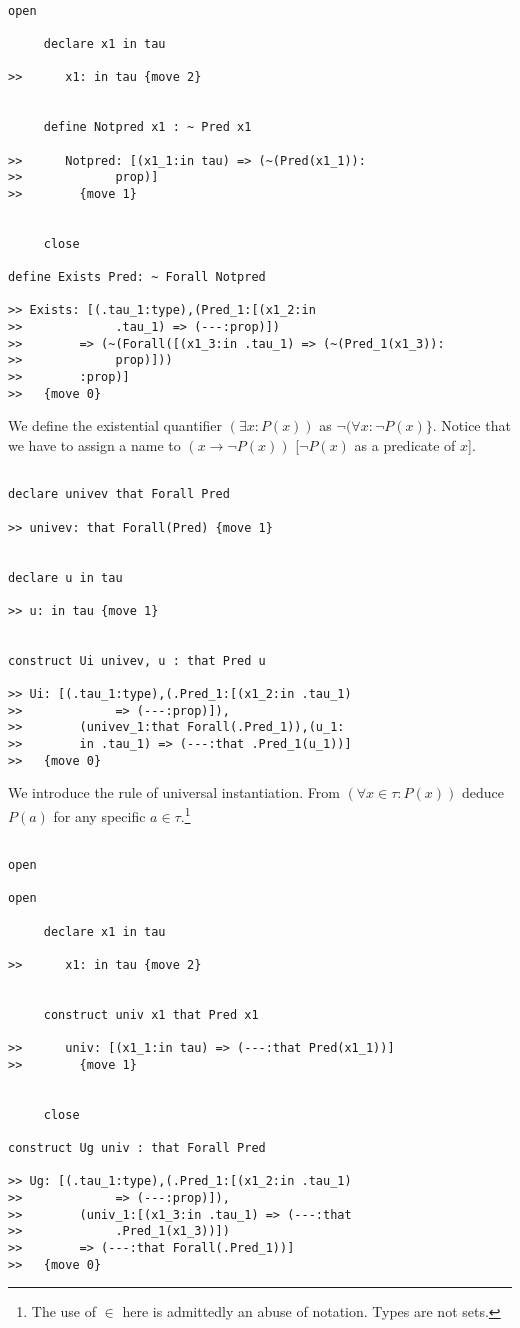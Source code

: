 \documentclass[12pt]{article}
\begin{document}
\begin{verbatim}

open

     declare x1 in tau

>>      x1: in tau {move 2}


     define Notpred x1 : ~ Pred x1

>>      Notpred: [(x1_1:in tau) => (~(Pred(x1_1)):
>>             prop)]
>>        {move 1}


     close

define Exists Pred: ~ Forall Notpred

>> Exists: [(.tau_1:type),(Pred_1:[(x1_2:in 
>>             .tau_1) => (---:prop)])
>>        => (~(Forall([(x1_3:in .tau_1) => (~(Pred_1(x1_3)):
>>             prop)]))
>>        :prop)]
>>   {move 0}

\end{verbatim}

We define the existential quantifier $(\exists x:P(x))$ as $\neg(\forall x:\neg P(x)\}$.  Notice that we have to
assign a name to $(x \rightarrow \neg P(x))$ [$\neg P(x)$ as a predicate of $x$].

\begin{verbatim}

declare univev that Forall Pred

>> univev: that Forall(Pred) {move 1}


declare u in tau

>> u: in tau {move 1}


construct Ui univev, u : that Pred u

>> Ui: [(.tau_1:type),(.Pred_1:[(x1_2:in .tau_1) 
>>             => (---:prop)]),
>>        (univev_1:that Forall(.Pred_1)),(u_1:
>>        in .tau_1) => (---:that .Pred_1(u_1))]
>>   {move 0}

\end{verbatim}

We introduce the rule of universal instantiation.  From $(\forall x \in \tau:P(x))$ deduce $P(a)$ for any specific $a \in \tau$.\footnote{The use of $\in$ here is admittedly an abuse of notation.  Types are not sets.}

\begin{verbatim}

open

open

     declare x1 in tau

>>      x1: in tau {move 2}


     construct univ x1 that Pred x1

>>      univ: [(x1_1:in tau) => (---:that Pred(x1_1))]
>>        {move 1}


     close

construct Ug univ : that Forall Pred

>> Ug: [(.tau_1:type),(.Pred_1:[(x1_2:in .tau_1) 
>>             => (---:prop)]),
>>        (univ_1:[(x1_3:in .tau_1) => (---:that 
>>             .Pred_1(x1_3))])
>>        => (---:that Forall(.Pred_1))]
>>   {move 0}

\end{verbatim}
\end{document}

